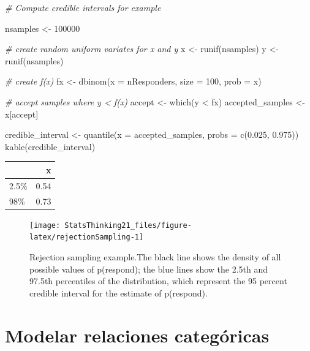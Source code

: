 \documentclass[
  12pt,
]{book}
\newenvironment{Shaded}{\begin{snugshade}}{\end{snugshade}}
\newcommand{\AttributeTok}[1]{\textcolor[rgb]{0.77,0.63,0.00}{#1}}
\newcommand{\CommentTok}[1]{\textcolor[rgb]{0.56,0.35,0.01}{\textit{#1}}}
\newcommand{\DecValTok}[1]{\textcolor[rgb]{0.00,0.00,0.81}{#1}}
\newcommand{\FloatTok}[1]{\textcolor[rgb]{0.00,0.00,0.81}{#1}}
\newcommand{\FunctionTok}[1]{\textcolor[rgb]{0.00,0.00,0.00}{#1}}
\newcommand{\NormalTok}[1]{#1}
\newcommand{\OtherTok}[1]{\textcolor[rgb]{0.56,0.35,0.01}{#1}}
\newcommand{\SpecialCharTok}[1]{\textcolor[rgb]{0.00,0.00,0.00}{#1}}
\theoremstyle{definition}
\theoremstyle{definition}
\theoremstyle{definition}
\theoremstyle{remark}
\begin{document}
\begin{Shaded}
\begin{Highlighting}[]
\CommentTok{\# Compute credible intervals for example}

\NormalTok{nsamples }\OtherTok{\textless{}{-}} \DecValTok{100000}

\CommentTok{\# create random uniform variates for x and y}
\NormalTok{x }\OtherTok{\textless{}{-}} \FunctionTok{runif}\NormalTok{(nsamples)}
\NormalTok{y }\OtherTok{\textless{}{-}} \FunctionTok{runif}\NormalTok{(nsamples)}

\CommentTok{\# create f(x)}
\NormalTok{fx }\OtherTok{\textless{}{-}} \FunctionTok{dbinom}\NormalTok{(}\AttributeTok{x =}\NormalTok{ nResponders, }\AttributeTok{size =} \DecValTok{100}\NormalTok{, }\AttributeTok{prob =}\NormalTok{ x)}

\CommentTok{\# accept samples where y \textless{} f(x)}
\NormalTok{accept }\OtherTok{\textless{}{-}} \FunctionTok{which}\NormalTok{(y }\SpecialCharTok{\textless{}}\NormalTok{ fx)}
\NormalTok{accepted\_samples }\OtherTok{\textless{}{-}}\NormalTok{ x[accept]}

\NormalTok{credible\_interval }\OtherTok{\textless{}{-}} \FunctionTok{quantile}\NormalTok{(}\AttributeTok{x =}\NormalTok{ accepted\_samples, }
                              \AttributeTok{probs =} \FunctionTok{c}\NormalTok{(}\FloatTok{0.025}\NormalTok{, }\FloatTok{0.975}\NormalTok{))}
\FunctionTok{kable}\NormalTok{(credible\_interval)}
\end{Highlighting}
\end{Shaded}

\begin{tabular}{l|r}
\hline
  & x\\
\hline
2.5\% & 0.54\\
\hline
98\% & 0.73\\
\hline
\end{tabular}

\begin{figure}
\texttt{[image: StatsThinking21\_files/figure-latex/rejectionSampling-1]} \caption{Rejection sampling example.The black line shows the density of all possible values of p(respond); the blue lines show the 2.5th and 97.5th percentiles of the distribution, which represent the 95 percent credible interval for the estimate of p(respond).}\label{fig:rejectionSampling}
\end{figure}

\hypertarget{modelar-relaciones-categuxf3ricas}{%
\chapter{Modelar relaciones categóricas}\label{modelar-relaciones-categuxf3ricas}}
\end{document}
